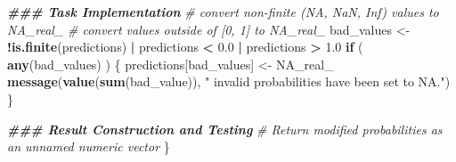 \documentclass[
]{book}
\newenvironment{Shaded}{\begin{snugshade}}{\end{snugshade}}
\newcommand{\CommentTok}[1]{\textcolor[rgb]{0.56,0.35,0.01}{\textit{#1}}}
\newcommand{\ConstantTok}[1]{\textcolor[rgb]{0.56,0.35,0.01}{#1}}
\newcommand{\ControlFlowTok}[1]{\textcolor[rgb]{0.13,0.29,0.53}{\textbf{#1}}}
\newcommand{\DocumentationTok}[1]{\textcolor[rgb]{0.56,0.35,0.01}{\textbf{\textit{#1}}}}
\newcommand{\FloatTok}[1]{\textcolor[rgb]{0.00,0.00,0.81}{#1}}
\newcommand{\FunctionTok}[1]{\textcolor[rgb]{0.13,0.29,0.53}{\textbf{#1}}}
\newcommand{\NormalTok}[1]{#1}
\newcommand{\OtherTok}[1]{\textcolor[rgb]{0.56,0.35,0.01}{#1}}
\newcommand{\SpecialCharTok}[1]{\textcolor[rgb]{0.81,0.36,0.00}{\textbf{#1}}}
\newcommand{\StringTok}[1]{\textcolor[rgb]{0.31,0.60,0.02}{#1}}
\begin{document}
\begin{Shaded}
\begin{Highlighting}[]
  \DocumentationTok{\#\#\# Task Implementation}
  \CommentTok{\# convert non{-}finite (NA, NaN, Inf) values to NA\_real\_}
  \CommentTok{\# convert values outside of [0, 1] to NA\_real\_}
\NormalTok{  bad\_values }\OtherTok{\textless{}{-}} \SpecialCharTok{!}\FunctionTok{is.finite}\NormalTok{(predictions) }\SpecialCharTok{|}\NormalTok{ predictions }\SpecialCharTok{\textless{}} \FloatTok{0.0} \SpecialCharTok{|}\NormalTok{ predictions }\SpecialCharTok{\textgreater{}} \FloatTok{1.0}
  \ControlFlowTok{if}\NormalTok{ ( }\FunctionTok{any}\NormalTok{(bad\_values) ) \{}
\NormalTok{    predictions[bad\_values] }\OtherTok{\textless{}{-}} \ConstantTok{NA\_real\_}
    \FunctionTok{message}\NormalTok{(}\FunctionTok{value}\NormalTok{(}\FunctionTok{sum}\NormalTok{(bad\_value)), }\StringTok{" invalid probabilities have been set to NA."}\NormalTok{)}
\NormalTok{  \}}
  
  \DocumentationTok{\#\#\# Result Construction and Testing}
  \CommentTok{\# Return modified probabilities as an unnamed numeric vector}
\NormalTok{\}}


\end{Highlighting}
\end{Shaded}
\end{document}

